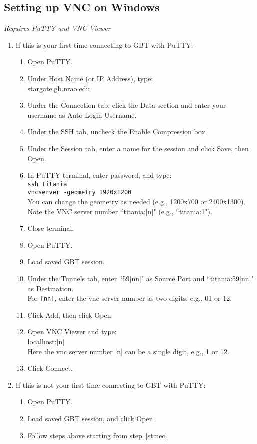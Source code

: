 \documentclass[11pt]{article}
\begin{document}
\subsection{Setting up VNC on Windows}\label{ssec:vncw}  %
\textit{Requires PuTTY and VNC Viewer} 
\begin{enumerate}
\item If this is your first time connecting to GBT with PuTTY: 
\begin{enumerate}
\item Open PuTTY. 
\item Under Host Name (or IP Address), type: \\
stargate.gb.nrao.edu
\item Under the Connection tab, click the Data section and enter your username as Auto-Login Username.
\item Under the SSH tab, uncheck the Enable Compression box.
\item Under the Session tab, enter a name for the session and click Save, then Open. 
\item\label{st:nec} In PuTTY terminal, enter password, and type: \\
\texttt{ssh titania \\
vncserver -geometry 1920x1200} \\
You can change the geometry as needed (e.g., 1200x700 or 2400x1300).  Note the VNC server number ``titania:[n]" (e.g., ``titania:1"). 
\item Close terminal. 
\item\label{st:op} Open PuTTY.
\item Load saved GBT session.
\item Under the Tunnels tab, enter ``59[nn]" as Source Port and ``titania:59[nn]" as Destination. \\
For \texttt{[nn]}, enter the vnc server number as two digits, e.g., 01 or 12.
\item Click Add, then click Open
\item Open VNC Viewer and type:\\
localhost:[n]\\
Here the vnc server number [n] can be a single digit, e.g., 1 or 12. 
\item Click Connect.
\end{enumerate}

\item If this is not your first time connecting to GBT with PuTTY:
\begin{enumerate}
\item Open PuTTY.
\item Load saved GBT session, and click Open.
\item Follow steps above starting from step~\ref{st:nec}
\end{enumerate}
\end{enumerate}
\end{document}
